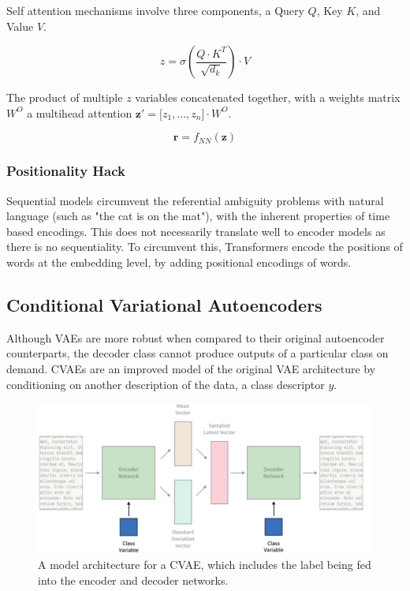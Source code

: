 \documentclass[12pt,twoside]{report}
\begin{document}
Self attention mechanisms involve three components, a Query $Q$, Key $K$, and Value $V$. 

\begin{equation}
	z = \sigma(\frac{Q \cdot K^T}{\sqrt{d_k}})\cdot V
\end{equation}

The product of multiple $z$ variables concatenated together, with a weights matrix $W^O$ a multihead attention $\boldsymbol{z}' = \lbrack z_1,...,z_n \rbrack \cdot W^O$. 

\begin{equation}
	\boldsymbol{r} = f_{NN}(\boldsymbol{z})
\end{equation}

\subsubsection{Positionality Hack}

Sequential models circumvent the referential ambiguity problems with natural language (such as "the cat is on the mat"), with the inherent properties of time based encodings. This does not necessarily translate well to encoder models as there is no sequentiality. To circumvent this, Transformers encode the positions of words at the embedding level, by adding positional encodings of words.


\subsection{Conditional Variational Autoencoders}

Although VAEs are more robust when compared to their original autoencoder counterparts, the decoder class cannot produce outputs of a particular class on demand. CVAEs are an improved model of the original VAE architecture by conditioning on another description of the data, a class descriptor $y$. 

\begin{figure}[!ht]
      
	\centering
	\includegraphics[width=150mm]{diagrams/conditional_variational_autoencoders.pdf}
	\caption{A model architecture for a CVAE, which includes the label being fed into the encoder and decoder networks. \label{cvae_diagram}}
  \end{figure}
\end{document}
